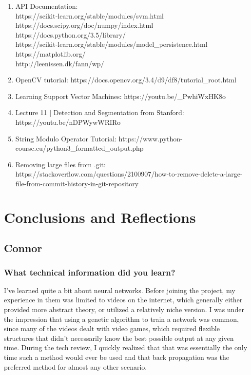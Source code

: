 \documentclass[10pt,journal,compsoc, draftclsnofoot,onecolumn]{IEEEtran}
\begin{document}
\begin{enumerate}

\item API Documentation: \\
https://scikit-learn.org/stable/modules/svm.html \\
https://docs.scipy.org/doc/numpy/index.html \\
https://docs.python.org/3.5/library/ \\
https://scikit-learn.org/stable/modules/model\_persistence.html \\
https://matplotlib.org/ \\
http://leenissen.dk/fann/wp/

\item OpenCV tutorial: https://docs.opencv.org/3.4/d9/df8/tutorial\_root.html 

\item Learning Support Vector Machines: https://youtu.be/\_PwhiWxHK8o

\item Lecture 11 | Detection and Segmentation from Stanford: https://youtu.be/nDPWywWRIRo

\item String Modulo Operator Tutorial: https://www.python-course.eu/python3\_formatted\_output.php

\item Removing large files from .git: https://stackoverflow.com/questions/2100907/how-to-remove-delete-a-large-file-from-commit-history-in-git-repository

\end{enumerate}


\newpage
\section{Conclusions and Reflections}
\subsection{Connor}

\subsubsection{What technical information did you learn?}
I've learned quite a bit about neural networks. 
Before joining the project, my experience in them was limited to videos on the internet, which generally either provided more abstract theory, or utilized a relatively niche version. 
I was under the impression that using a genetic algorithm to train a network was common, since many of the videos dealt with video games, which required flexible structures that didn't necessarily know the best possible output at any given time. 
During the tech review, I quickly realized that that was essentially the only time such a method would ever be used and that back propagation was the preferred method for almost any other scenario.
\end{document}
